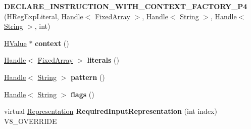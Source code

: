 \begin{DoxyCompactItemize}
\item 
\hypertarget{classv8_1_1internal_1_1_v8___f_i_n_a_l_a7b67decf1dc60f1181a6906c614ff53b}{}{\bfseries D\+E\+C\+L\+A\+R\+E\+\_\+\+I\+N\+S\+T\+R\+U\+C\+T\+I\+O\+N\+\_\+\+W\+I\+T\+H\+\_\+\+C\+O\+N\+T\+E\+X\+T\+\_\+\+F\+A\+C\+T\+O\+R\+Y\+\_\+\+P4} (H\+Reg\+Exp\+Literal, \hyperlink{classv8_1_1internal_1_1_handle}{Handle}$<$ \hyperlink{classv8_1_1internal_1_1_fixed_array}{Fixed\+Array} $>$, \hyperlink{classv8_1_1internal_1_1_handle}{Handle}$<$ \hyperlink{classv8_1_1internal_1_1_string}{String} $>$, \hyperlink{classv8_1_1internal_1_1_handle}{Handle}$<$ \hyperlink{classv8_1_1internal_1_1_string}{String} $>$, int)\label{classv8_1_1internal_1_1_v8___f_i_n_a_l_a7b67decf1dc60f1181a6906c614ff53b}

\item 
\hypertarget{classv8_1_1internal_1_1_v8___f_i_n_a_l_a911a04b75b22f133c5eb5eafcc2d5f87}{}\hyperlink{classv8_1_1internal_1_1_h_value}{H\+Value} $\ast$ {\bfseries context} ()\label{classv8_1_1internal_1_1_v8___f_i_n_a_l_a911a04b75b22f133c5eb5eafcc2d5f87}

\item 
\hypertarget{classv8_1_1internal_1_1_v8___f_i_n_a_l_af18aac83958b889c10df1acda087a41c}{}\hyperlink{classv8_1_1internal_1_1_handle}{Handle}$<$ \hyperlink{classv8_1_1internal_1_1_fixed_array}{Fixed\+Array} $>$ {\bfseries literals} ()\label{classv8_1_1internal_1_1_v8___f_i_n_a_l_af18aac83958b889c10df1acda087a41c}

\item 
\hypertarget{classv8_1_1internal_1_1_v8___f_i_n_a_l_ae7eaa32d3e53d7b02b0c2e000d9e31cd}{}\hyperlink{classv8_1_1internal_1_1_handle}{Handle}$<$ \hyperlink{classv8_1_1internal_1_1_string}{String} $>$ {\bfseries pattern} ()\label{classv8_1_1internal_1_1_v8___f_i_n_a_l_ae7eaa32d3e53d7b02b0c2e000d9e31cd}

\item 
\hypertarget{classv8_1_1internal_1_1_v8___f_i_n_a_l_a07f84313d7210782e446715ecf99af04}{}\hyperlink{classv8_1_1internal_1_1_handle}{Handle}$<$ \hyperlink{classv8_1_1internal_1_1_string}{String} $>$ {\bfseries flags} ()\label{classv8_1_1internal_1_1_v8___f_i_n_a_l_a07f84313d7210782e446715ecf99af04}

\item 
\hypertarget{classv8_1_1internal_1_1_v8___f_i_n_a_l_a6c6d1f37f40b113d8f4062f1ffff7215}{}virtual \hyperlink{classv8_1_1internal_1_1_representation}{Representation} {\bfseries Required\+Input\+Representation} (int index) V8\+\_\+\+O\+V\+E\+R\+R\+I\+D\+E\label{classv8_1_1internal_1_1_v8___f_i_n_a_l_a6c6d1f37f40b113d8f4062f1ffff7215}


\end{DoxyCompactItemize}
